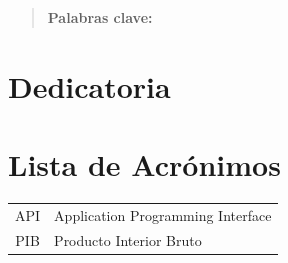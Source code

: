 \documentclass[12pt]{report} %
\begin{document}
\newpage %
\thispagestyle{empty}
\mbox{}

\renewcommand\abstractname{\large\bfseries\filcenter\uppercase{Resumen}}
\begin{abstract}
\thispagestyle{plain}
\setcounter{page}{3}
	
	
	\textbf{Palabras clave:}
	
	\vfill
\end{abstract}
	\newpage %
	\thispagestyle{empty}
	\mbox{}


\chapter*{Dedicatoria}

\setcounter{page}{5}
	
		
	\vfill
	
	\newpage %
	\thispagestyle{empty}
	\mbox{}
	


\tableofcontents
\thispagestyle{fancy}

\newpage %
\thispagestyle{empty}
\mbox{}

\listoffigures
\thispagestyle{fancy}

\newpage %
\thispagestyle{empty}
\mbox{}

\listoftables
\thispagestyle{fancy}

\newpage %
\thispagestyle{empty}
\mbox{}

\chapter*{Lista de Acrónimos}
\begin{center}
	\begin{tabular}{c p{8cm}} %
			API & Application Programming Interface \\
			PIB & Producto Interior Bruto
	\end{tabular}
\end{center}
\end{document}
